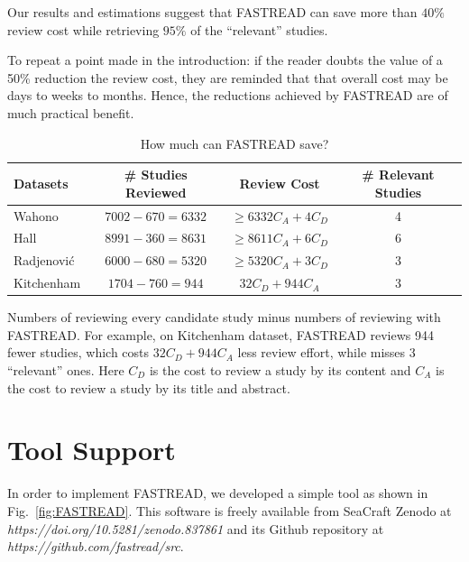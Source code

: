 \documentclass{svjour3}
\theoremstyle{break}
\begin{document}
\begin{lesson}
    Our results and estimations suggest that FASTREAD can save more than $40\%$ review cost while retrieving $95\%$ of the ``relevant'' studies.
\end{lesson}

To repeat a point made in the introduction: if the reader doubts the value of a 50\% reduction the review cost, they are reminded that that overall cost may be days to weeks to months. Hence, the reductions achieved by FASTREAD are of much practical benefit.


\begin{table}
\caption{How much can FASTREAD save?}
\label{tab: save}
\begin{center}
\begin{tabular}{ |l|c|c|c|}
  \hline
   Datasets & \# Studies Reviewed & Review Cost & \# Relevant Studies \\
  \hline
  Wahono & $7002-670=6332$ & $\geq6332C_A+4C_D$ & 4\\
  \hline
  Hall & $8991-360=8631$ & $\geq8611C_A+6C_D$ & 6\\
  \hline
  Radjenovi{\'c} & $6000-680=5320$ & $\geq5320C_A+3C_D$ & 3\\
  \hline
  Kitchenham & $1704-760=944$ & $32C_D+944C_A$ & 3\\
  \hline
\end{tabular}
\end{center}
{\footnotesize Numbers of reviewing every candidate study minus numbers of reviewing with FASTREAD. For example, on Kitchenham dataset, FASTREAD reviews 944 fewer studies, which costs $32C_D+944C_A$ less review effort, while misses 3 ``relevant'' ones. Here $C_D$ is the cost to review a study by its content and $C_A$ is the cost to review a study by its title and abstract.}
\end{table}



\section{Tool Support}
\label{sect: tool}

In order to implement FASTREAD, we developed a simple tool as shown in Fig.~\ref{fig:FASTREAD}. This software is freely available from SeaCraft Zenodo at \textit{https://doi.org/10.5281/zenodo.837861} and its Github repository at \textit{https://github.com/fastread/src}. 
\end{document}
